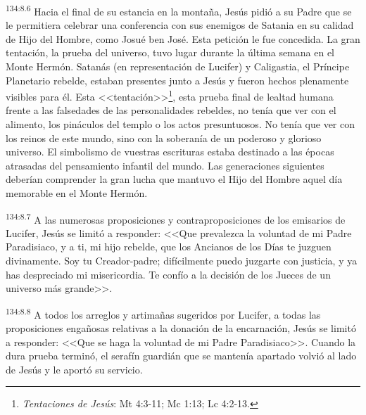 \par 
\textsuperscript{134:8.6} Hacia el final de su estancia en la montaña, Jesús pidió a su Padre que se le permitiera celebrar una conferencia con sus enemigos de Satania en su calidad de Hijo del Hombre, como Josué ben José. Esta petición le fue concedida. La gran tentación, la prueba del universo, tuvo lugar durante la última semana en el Monte Hermón. Satanás (en representación de Lucifer) y Caligastia, el Príncipe Planetario rebelde, estaban presentes junto a Jesús y fueron hechos plenamente visibles para él. Esta <<tentación>>\footnote{\textit{Tentaciones de Jesús}: Mt 4:3-11; Mc 1:13; Lc 4:2-13.}, esta prueba final de lealtad humana frente a las falsedades de las personalidades rebeldes, no tenía que ver con el alimento, los pináculos del templo o los actos presuntuosos. No tenía que ver con los reinos de este mundo, sino con la soberanía de un poderoso y glorioso universo. El simbolismo de vuestras escrituras estaba destinado a las épocas atrasadas del pensamiento infantil del mundo. Las generaciones siguientes deberían comprender la gran lucha que mantuvo el Hijo del Hombre aquel día memorable en el Monte Hermón.

\par 
\textsuperscript{134:8.7} A las numerosas proposiciones y contraproposiciones de los emisarios de Lucifer, Jesús se limitó a responder: <<Que prevalezca la voluntad de mi Padre Paradisiaco, y a ti, mi hijo rebelde, que los Ancianos de los Días te juzguen divinamente. Soy tu Creador-padre; difícilmente puedo juzgarte con justicia, y ya has despreciado mi misericordia. Te confío a la decisión de los Jueces de un universo más grande>>.

\par 
\textsuperscript{134:8.8} A todos los arreglos y artimañas sugeridos por Lucifer, a todas las proposiciones engañosas relativas a la donación de la encarnación, Jesús se limitó a responder: <<Que se haga la voluntad de mi Padre Paradisiaco>>. Cuando la dura prueba terminó, el serafín guardián que se mantenía apartado volvió al lado de Jesús y le aportó su servicio.

